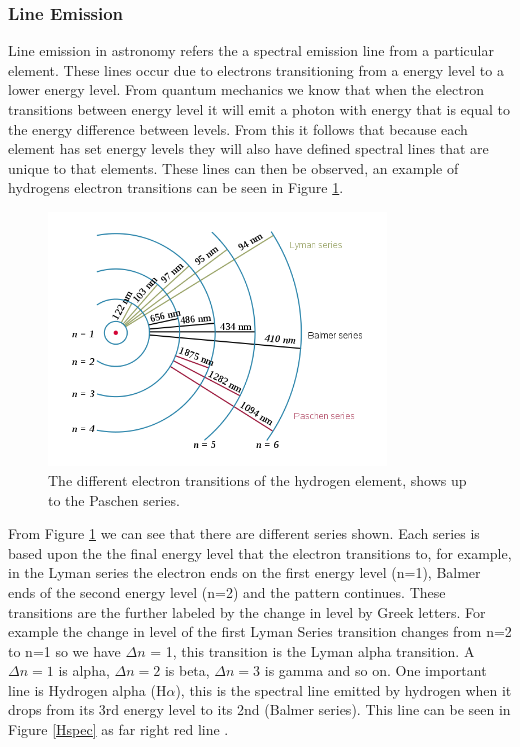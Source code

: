 \documentclass[a4paper, 10pt]{article}
\begin{document}
\subsubsection*{Line Emission}
Line emission in astronomy refers the a spectral emission line from a particular element. These lines occur due to electrons transitioning from a energy level to a lower energy level. From quantum mechanics we know that when the electron transitions between energy level it will emit a photon with energy that is equal to the energy difference between levels. From this it follows that because each element has set energy levels they will also have defined spectral lines that are unique to that elements. These lines can then be observed, an example of hydrogens electron transitions can be seen in Figure \ref{Hline}.
\begin{figure}[H]
\begin{center}
	\includegraphics[width=0.8\textwidth]{Hline}
	\caption{The different electron transitions of the hydrogen element, shows up to the Paschen series\footnotemark.}
	\label{Hline}
\end{center}
\end{figure}
From Figure \ref{Hline} we can see that there are different series shown. Each series is based upon the the final energy level that the electron transitions to, for example, in the Lyman series the electron ends on the first energy level (n=1), Balmer ends of the second energy level (n=2) and the pattern continues. These transitions are the further labeled by the change in level by Greek letters. For example the change in level of the first Lyman Series transition changes from n=2 to n=1 so we have $\Delta n$ = 1, this transition is the Lyman alpha transition. A $\Delta n = 1$ is alpha,  $\Delta n = 2$ is beta,  $\Delta n = 3$ is gamma and so on. One important line is Hydrogen alpha (H$\alpha$), this is the spectral line emitted by hydrogen when it drops from its 3rd energy level to its 2nd (Balmer series). This line can be seen in Figure \ref{Hspec} as far right red line .
\end{document}
